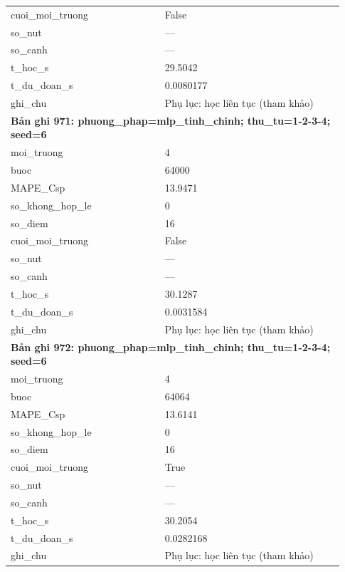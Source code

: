 \begin{longtable}{p{0.43\linewidth}p{0.50\linewidth}}
cuoi\_\allowbreak moi\_\allowbreak truong & False \\
so\_\allowbreak nut & — \\
so\_\allowbreak canh & — \\
t\_\allowbreak hoc\_\allowbreak s & 29.5042 \\
t\_\allowbreak du\_\allowbreak doan\_\allowbreak s & 0.0080177 \\
ghi\_\allowbreak chu & Phụ lục: học liên tục (tham khảo) \\
\midrule
\multicolumn{2}{p{0.95\linewidth}}{\textbf{Bản ghi 971: phuong\_phap=mlp\_tinh\_chinh; thu\_tu=1-2-3-4; seed=6}} \\
moi\_\allowbreak truong & 4 \\
buoc & 64000 \\
MAPE\_\allowbreak Csp & 13.9471 \\
so\_\allowbreak khong\_\allowbreak hop\_\allowbreak le & 0 \\
so\_\allowbreak diem & 16 \\
cuoi\_\allowbreak moi\_\allowbreak truong & False \\
so\_\allowbreak nut & — \\
so\_\allowbreak canh & — \\
t\_\allowbreak hoc\_\allowbreak s & 30.1287 \\
t\_\allowbreak du\_\allowbreak doan\_\allowbreak s & 0.0031584 \\
ghi\_\allowbreak chu & Phụ lục: học liên tục (tham khảo) \\
\midrule
\multicolumn{2}{p{0.95\linewidth}}{\textbf{Bản ghi 972: phuong\_phap=mlp\_tinh\_chinh; thu\_tu=1-2-3-4; seed=6}} \\
moi\_\allowbreak truong & 4 \\
buoc & 64064 \\
MAPE\_\allowbreak Csp & 13.6141 \\
so\_\allowbreak khong\_\allowbreak hop\_\allowbreak le & 0 \\
so\_\allowbreak diem & 16 \\
cuoi\_\allowbreak moi\_\allowbreak truong & True \\
so\_\allowbreak nut & — \\
so\_\allowbreak canh & — \\
t\_\allowbreak hoc\_\allowbreak s & 30.2054 \\
t\_\allowbreak du\_\allowbreak doan\_\allowbreak s & 0.0282168 \\
ghi\_\allowbreak chu & Phụ lục: học liên tục (tham khảo) \\

\end{longtable}

